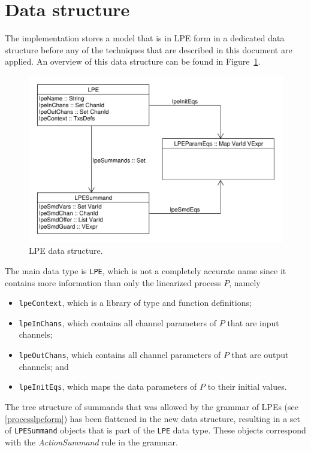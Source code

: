 \section{Data structure}

The implementation stores a \txs{} model that is in LPE form in a dedicated data structure before any of the techniques that are described in this document are applied.
An overview of this data structure can be found in Figure~\ref{lpedatastructure:fig}.

\begin{figure}[!ht]
\begin{center}
\includegraphics[width=0.7\linewidth]{images/lpe-types}
\caption{LPE data structure.}
\label{lpedatastructure:fig}
\end{center}
\end{figure}

The main data type is \texttt{LPE}, which is not a completely accurate name since it contains more information than only the linearized \txs{} process $P$, namely

\begin{itemize}
\item \texttt{lpeContext}, which is a library of \txs{} type and function definitions;
\item \texttt{lpeInChans}, which contains all channel parameters of $P$ that are input channels;
\item \texttt{lpeOutChans}, which contains all channel parameters of $P$ that are output channels; and
\item \texttt{lpeInitEqs}, which maps the data parameters of $P$ to their initial values.
\end{itemize}

The tree structure of summands that was allowed by the grammar of LPEs (see \ref{processlpeform}) has been flattened in the new data structure, resulting in a set of \texttt{LPESummand} objects that is part of the \texttt{LPE} data type.
These objects correspond with the \textit{ActionSummand} rule in the grammar.

